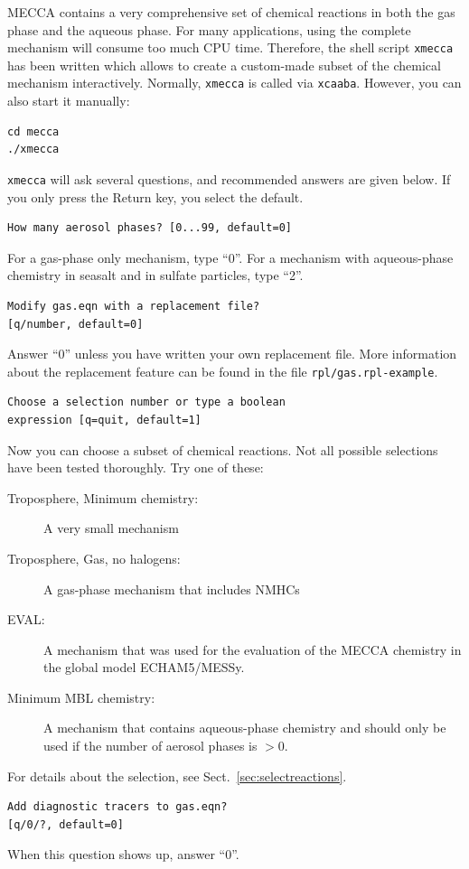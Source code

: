 \documentclass[twoside]{article}
\begin{document}
MECCA contains a very comprehensive set of chemical reactions in both
the gas phase and the aqueous phase. For many applications, using the
complete mechanism will consume too much CPU time. Therefore, the shell
script \verb|xmecca| has been written which allows to create a
custom-made subset of the chemical mechanism interactively. Normally,
\verb|xmecca| is called via \verb|xcaaba|. However, you can also start
it manually:
\begin{verbatim}
cd mecca
./xmecca
\end{verbatim}
\verb|xmecca| will ask several questions, and recommended answers are
given below. If you only press the Return key, you select the default.
\begin{verbatim}
How many aerosol phases? [0...99, default=0]
\end{verbatim}
For a gas-phase only mechanism, type ``0''. For a mechanism with
aqueous-phase chemistry in seasalt and in sulfate particles, type ``2''.
\begin{verbatim}
Modify gas.eqn with a replacement file?
[q/number, default=0]
\end{verbatim}
Answer ``0'' unless you have written your own replacement file. More
information about the replacement feature can be found in the file
\verb|rpl/gas.rpl-example|.
\begin{verbatim}
Choose a selection number or type a boolean
expression [q=quit, default=1]
\end{verbatim}
Now you can choose a subset of chemical reactions. Not all possible
selections have been tested thoroughly. Try one of these:
\begin{description}
\item [Troposphere, Minimum chemistry:] A very small mechanism
\item [Troposphere, Gas, no halogens:] A gas-phase mechanism that
  includes NMHCs
\item [EVAL:] A mechanism that was used for the evaluation of the MECCA
  chemistry in the global model ECHAM5/MESSy.
\item [Minimum MBL chemistry:] A mechanism that contains aqueous-phase
  chemistry and should only be used if the number of aerosol phases is
  $>0$.
\end{description}
For details about the selection, see Sect.~\ref{sec:selectreactions}.
\begin{verbatim}
Add diagnostic tracers to gas.eqn?
[q/0/?, default=0]
\end{verbatim}
When this question shows up, answer ``0''.
\end{document}
